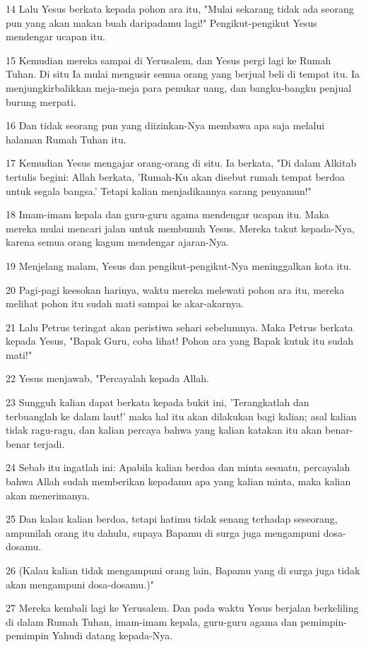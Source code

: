 \par 14 Lalu Yesus berkata kepada pohon ara itu, "Mulai sekarang tidak ada seorang pun yang akan makan buah daripadamu lagi!" Pengikut-pengikut Yesus mendengar ucapan itu.
\par 15 Kemudian mereka sampai di Yerusalem, dan Yesus pergi lagi ke Rumah Tuhan. Di situ Ia mulai mengusir semua orang yang berjual beli di tempat itu. Ia menjungkirbalikkan meja-meja para penukar uang, dan bangku-bangku penjual burung merpati.
\par 16 Dan tidak seorang pun yang diizinkan-Nya membawa apa saja melalui halaman Rumah Tuhan itu.
\par 17 Kemudian Yesus mengajar orang-orang di situ. Ia berkata, "Di dalam Alkitab tertulis begini: Allah berkata, 'Rumah-Ku akan disebut rumah tempat berdoa untuk segala bangsa.' Tetapi kalian menjadikannya sarang penyamun!"
\par 18 Imam-imam kepala dan guru-guru agama mendengar ucapan itu. Maka mereka mulai mencari jalan untuk membunuh Yesus. Mereka takut kepada-Nya, karena semua orang kagum mendengar ajaran-Nya.
\par 19 Menjelang malam, Yesus dan pengikut-pengikut-Nya meninggalkan kota itu.
\par 20 Pagi-pagi keesokan harinya, waktu mereka melewati pohon ara itu, mereka melihat pohon itu sudah mati sampai ke akar-akarnya.
\par 21 Lalu Petrus teringat akan peristiwa sehari sebelumnya. Maka Petrus berkata kepada Yesus, "Bapak Guru, coba lihat! Pohon ara yang Bapak kutuk itu sudah mati!"
\par 22 Yesus menjawab, "Percayalah kepada Allah.
\par 23 Sungguh kalian dapat berkata kepada bukit ini, 'Terangkatlah dan terbuanglah ke dalam laut!' maka hal itu akan dilakukan bagi kalian; asal kalian tidak ragu-ragu, dan kalian percaya bahwa yang kalian katakan itu akan benar-benar terjadi.
\par 24 Sebab itu ingatlah ini: Apabila kalian berdoa dan minta sesuatu, percayalah bahwa Allah sudah memberikan kepadamu apa yang kalian minta, maka kalian akan menerimanya.
\par 25 Dan kalau kalian berdoa, tetapi hatimu tidak senang terhadap seseorang, ampunilah orang itu dahulu, supaya Bapamu di surga juga mengampuni dosa-dosamu.
\par 26 (Kalau kalian tidak mengampuni orang lain, Bapamu yang di surga juga tidak akan mengampuni dosa-dosamu.)"
\par 27 Mereka kembali lagi ke Yerusalem. Dan pada waktu Yesus berjalan berkeliling di dalam Rumah Tuhan, imam-imam kepala, guru-guru agama dan pemimpin-pemimpin Yahudi datang kepada-Nya.
